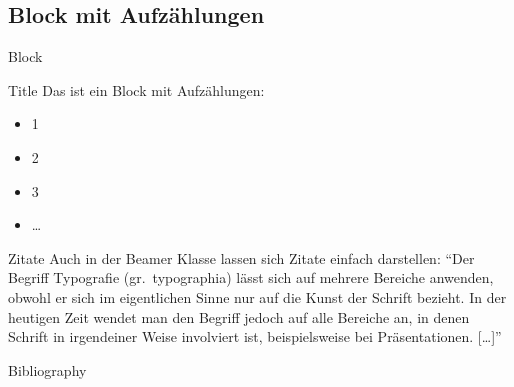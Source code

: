 \documentclass{beamer}
\begin{document}
\subsection{Block mit Aufzählungen}
\begin{frame}{Block}
\begin{block}{Title}
Das ist ein Block mit Aufzählungen:
\begin{itemize}
	\item 1
	\item 2
	\item 3
	\item \ldots
\end{itemize}
\end{block}
\end{frame}

\begin{frame}{Zitate}
Auch in der Beamer Klasse lassen sich Zitate einfach darstellen:\vspace*{1.5cm}
\enquote{Der Begriff Typografie (gr.\ typographia) lässt sich auf mehrere Bereiche anwenden, obwohl er sich im eigentlichen Sinne nur auf die Kunst der Schrift bezieht. In der heutigen Zeit wendet man den Begriff jedoch auf alle Bereiche an, in denen Schrift in irgendeiner Weise involviert ist, beispielsweise bei Präsentationen. [\ldots]}~\parencite[S.~7]{voss2012}
\end{frame}

\begin{frame}[allowframebreaks]{Bibliography}
\nocite{*}
\printbibliography
\end{frame}
\end{document}
